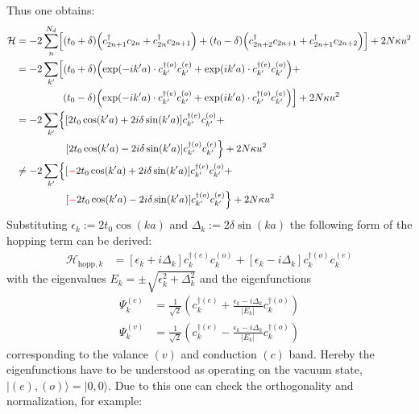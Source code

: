 Thus one obtains:
\begin{align}
	\mathcal{H} &= -2\sum_n^{N_d} \left[\left(t_0+\delta\right)\left(c_{2n+1}^\dagger c_{2n} + c_{2n}^\dagger c_{2n+1} \right) + 
	\left(t_0-\delta\right)\left(c_{2n+2}^\dagger c_{2n+1} + c_{2n+1}^\dagger c_{2n+2}\right)\right]+2N\kappa u^2\\
	&= -2\sum_{k'} \left[\left(t_0+\delta\right)\left(\exp\left(-ik'a\right) \cdot c_{k'}^{\dagger(o)}c_{k'}^{(e)} + \exp\left(ik'a\right)\cdot c_{k'}^{\dagger(e)}c_{k'}^{(o)}\right)+ \right.\nonumber\\
	&\hspace*{1.6cm}\left.\left(t_0-\delta\right)\left(\exp\left(-ik'a\right)\cdot  c_{k'}^{\dagger(e)}c_{k'}^{(o)}+\exp\left(ik'a\right)\cdot  c_{k'}^{\dagger(o)}c_{k'}^{(e)}\right)\right]+2N\kappa u^2\\
	&= -2\sum_{k'} \left\{\left[2t_0\cos(k'a) + 2i\delta\sin(k'a)\right]c_{k'}^{\dagger(e)}c_{k'}^{(o)} + \right.\nonumber\\
	&\hspace*{1.7cm}\left. \left[2t_0\cos(k'a)-2i\delta\sin(k'a)\right] c_{k'}^{\dagger(o)}c_{k'}^{(e)}\right\}+2N\kappa u^2\\
	&\neq-2\sum_{k'} \left\{\left[\textcolor{red}{-}2t_0\cos(k'a) + 2i\delta\sin(k'a)\right]c_{k'}^{\dagger(e)}c_{k'}^{(o)} + \right.\nonumber\\
	&\hspace*{1.7cm}\left. \left[\textcolor{red}{-}2t_0\cos(k'a)-2i\delta\sin(k'a)\right] c_{k'}^{\dagger(o)}c_{k'}^{(e)}\right\}+2N\kappa u^2
\end{align}
Substituting $\epsilon_k := 2t_0\cos(ka)$ and $\Delta_k := 2\delta\sin(ka)$ the following form of the hopping term can be derived:
\begin{align}
	\mathcal{H}_{\text{hopp},k} &=
	\left[\epsilon_k + i\Delta_k\right]c_{k}^{\dagger(e)}c_{k}^{(o)} + \left[\epsilon_k-i\Delta_k \right]	c_{k}^{\dagger(o)}c_{k}^{(e)}
\end{align}
with the eigenvalues $E_k = \pm \sqrt{\epsilon_k^2+\Delta_k^2}$ and the eigenfunctions
\begin{align}
	\Psi_k^{(c)} &= \frac{1}{\sqrt{2}}\left(c_k^{\dagger(e)}+\frac{\epsilon_k - i \Delta_k}{|E_k|}c_{k}^{\dagger(o)}\right)\\
	\Psi_k^{(v)} &= \frac{1}{\sqrt{2}}\left(c_k^{\dagger(e)}-\frac{\epsilon_k - i \Delta_k}{|E_k|}c_{k}^{\dagger(o)}\right)
\end{align}
corresponding to the valance $(v)$ and conduction $(c)$ band. Hereby the eigenfunctions have to be understood as operating on the vacuum state, $|(e),(o)\rangle = |0,0\rangle$. Due to this one can check the orthogonality and normalization, for example:
